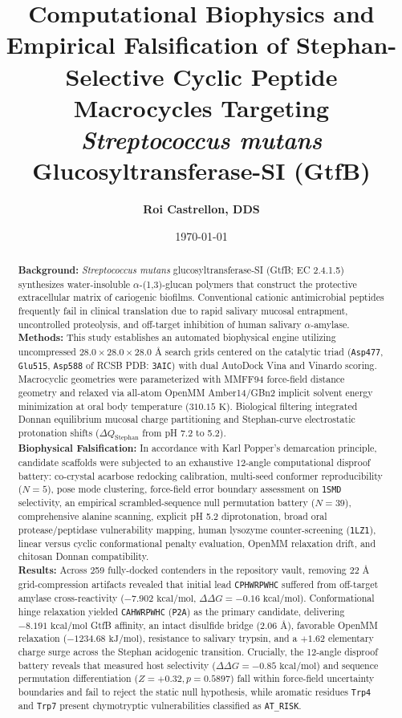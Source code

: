 \documentclass[11pt,a4paper]{article}
\title{\textbf{Computational Biophysics and Empirical Falsification of Stephan-Selective Cyclic Peptide Macrocycles Targeting \textit{Streptococcus mutans} Glucosyltransferase-SI (GtfB)}}
\author{\textbf{Roi Castrellon, DDS}}
\affil{DrNemo Oral Biophysics Research, Miami, FL, USA \\ \texttt{roisasha@gmail.com}}
\date{\today}
\begin{document}
\maketitle

\begin{abstract}
\noindent\textbf{Background:} \textit{Streptococcus mutans} glucosyltransferase-SI (GtfB; EC 2.4.1.5) synthesizes water-insoluble $\alpha$-(1,3)-glucan polymers that construct the protective extracellular matrix of cariogenic biofilms. Conventional cationic antimicrobial peptides frequently fail in clinical translation due to rapid salivary mucosal entrapment, uncontrolled proteolysis, and off-target inhibition of human salivary $\alpha$-amylase. \\
\textbf{Methods:} This study establishes an automated biophysical engine utilizing uncompressed $28.0 \times 28.0 \times 28.0\text{ \AA}$ search grids centered on the catalytic triad (\texttt{Asp477}, \texttt{Glu515}, \texttt{Asp588} of RCSB PDB: \texttt{3AIC}) with dual AutoDock Vina and Vinardo scoring. Macrocyclic geometries were parameterized with MMFF94 force-field distance geometry and relaxed via all-atom OpenMM Amber14/GBn2 implicit solvent energy minimization at oral body temperature ($310.15\text{ K}$). Biological filtering integrated Donnan equilibrium mucosal charge partitioning and Stephan-curve electrostatic protonation shifts ($\Delta Q_{\text{Stephan}}$ from pH 7.2 to 5.2). \\
\textbf{Biophysical Falsification:} In accordance with Karl Popper's demarcation principle, candidate scaffolds were subjected to an exhaustive 12-angle computational disproof battery: co-crystal acarbose redocking calibration, multi-seed conformer reproducibility ($N=5$), pose mode clustering, force-field error boundary assessment on \texttt{1SMD} selectivity, an empirical scrambled-sequence null permutation battery ($N=39$), comprehensive alanine scanning, explicit pH 5.2 diprotonation, broad oral protease/peptidase vulnerability mapping, human lysozyme counter-screening (\texttt{1LZ1}), linear versus cyclic conformational penalty evaluation, OpenMM relaxation drift, and chitosan Donnan compatibility. \\
\textbf{Results:} Across 259 fully-docked contenders in the repository vault, removing $22\text{ \AA}$ grid-compression artifacts revealed that initial lead \texttt{CPHWRPWHC} suffered from off-target amylase cross-reactivity ($-7.902\text{ kcal/mol}$, $\Delta\Delta G = -0.16\text{ kcal/mol}$). Conformational hinge relaxation yielded \texttt{CAHWRPWHC} (\texttt{P2A}) as the primary candidate, delivering $-8.191\text{ kcal/mol}$ GtfB affinity, an intact disulfide bridge ($2.06\text{ \AA}$), favorable OpenMM relaxation ($-1234.68\text{ kJ/mol}$), resistance to salivary trypsin, and a $+1.62$ elementary charge surge across the Stephan acidogenic transition. Crucially, the 12-angle disproof battery reveals that measured host selectivity ($\Delta\Delta G = -0.85\text{ kcal/mol}$) and sequence permutation differentiation ($Z = +0.32, p = 0.5897$) fall within force-field uncertainty boundaries and fail to reject the static null hypothesis, while aromatic residues \texttt{Trp4} and \texttt{Trp7} present chymotryptic vulnerabilities classified as \texttt{AT\_RISK}. \\

\end{abstract}
\end{document}
